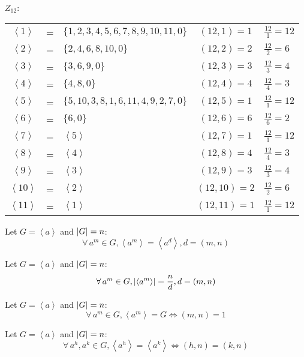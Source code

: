 \documentclass[letterpaper,12pt,fleqn]{article}
\newcommand{\cycle}[1]{\left<#1\right>}
\begin{document}
\begin{example}
  $Z_{12}$:
  
  \begin{tabular}{cclcl}
    $\cycle{1}$ & = & $\{1,2,3,4,5,6,7,8,9,10,11,0\}$ & $(12,1)=1$ &
    $\frac{12}{1}=12$ \\
    $\cycle{2}$ & = & $\{2,4,6,8,10,0\}$ & $(12,2)=2$ &
    $\frac{12}{2}=6$ \\
    $\cycle{3}$ & = & $\{3,6,9,0\}$ & $(12,3)=3$ &
    $\frac{12}{3}=4$ \\
    $\cycle{4}$ & = & $\{4,8,0\}$ & $(12,4)=4$ &
    $\frac{12}{4}=3$ \\
    $\cycle{5}$ & = & $\{5,10,3,8,1,6,11,4,9,2,7,0\}$ & $(12,5)=1$ &
    $\frac{12}{1}=12$ \\
    $\cycle{6}$ & = & $\{6,0\}$ & $(12,6)=6$ &
    $\frac{12}{6}=2$ \\
    $\cycle{7}$ & = & $\cycle{5}$ & $(12,7)=1$ &
    $\frac{12}{1}=12$ \\
    $\cycle{8}$ & = & $\cycle{4}$ & $(12,8)=4$ &
    $\frac{12}{4}=3$ \\
    $\cycle{9}$ & = & $\cycle{3}$ & $(12,9)=3$ &
    $\frac{12}{3}=4$ \\
    $\cycle{10}$ & = & $\cycle{2}$ & $(12,10)=2$ &
    $\frac{12}{2}=6$ \\
    $\cycle{11}$ & = & $\cycle{1}$ & $(12,11)=1$ &
    $\frac{12}{1}=12$ \\
  \end{tabular}

  \bigskip

\end{example}

\begin{corollary}
  Let $G=\cycle{a}$ and $\lvert G\rvert=n$:
  \[\forall\,a^m\in G,\cycle{a^m}=\cycle{a^d},d=(m,n)\]
\end{corollary}

\begin{corollary}
  Let $G=\cycle{a}$ and $\lvert G\rvert=n$:
  \[\forall\,a^m\in G,\abs{\cycle{a^m}}=\frac{n}{d},d=(m,n)\]
\end{corollary}

\begin{corollary}
  Let $G=\cycle{a}$ and $\lvert G\rvert=n$:
  \[\forall\,a^m\in G,\cycle{a^m}=G\iff(m,n)=1\]
\end{corollary}

\begin{corollary}
  Let $G=\cycle{a}$ and $\lvert G\rvert=n$:
  \[\forall\,a^h,a^k\in G,\cycle{a^h}=\cycle{a^k}\iff(h,n)=(k,n)\]
\end{corollary}
\end{document}
